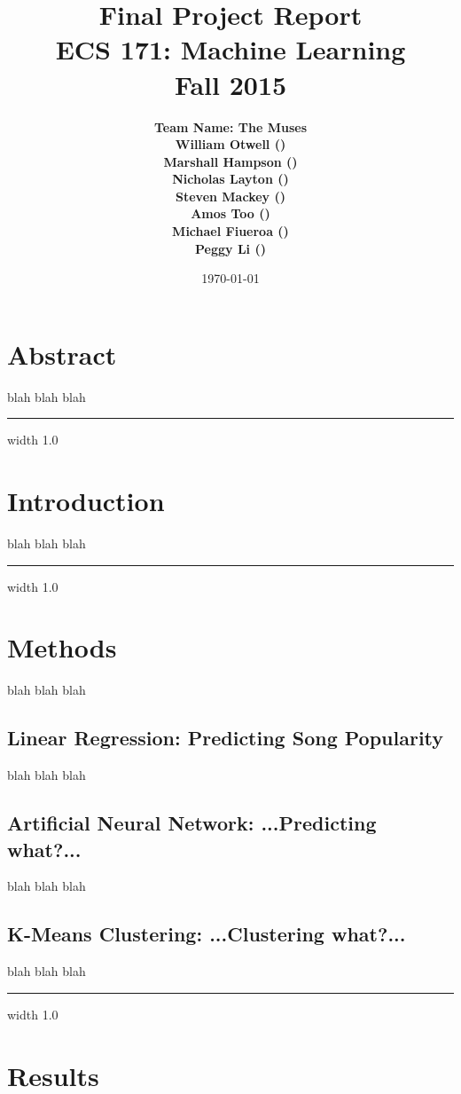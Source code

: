 \documentclass[11pt]{article}
\title{\vspace{-3ex}\bf Final Project Report\\[2ex] 
       \normalsize ECS 171: Machine Learning\\Fall 2015}
\date{\today}
\author{\bf Team Name: The Muses\\ \bf William Otwell ()\\ \bf Marshall Hampson ()\\ \bf Nicholas Layton ()\\ \bf Steven Mackey ()\\ \bf Amos Too ()\\ \bf Michael Fiueroa ()\\ \bf Peggy Li ()}
\newcommand{\horizontalLine}{
	\begin{center}
		\hrule width 1.0\textwidth
	\end{center}
}
\begin{document}
\maketitle
\pagebreak
\tableofcontents
\pagebreak

\section{Abstract}
\label{sec:abstract}
blah blah blah

\horizontalLine
\section{Introduction}
\label{sec:introduction}
blah blah blah

\horizontalLine
\section{Methods}
\label{sec:methods}
blah blah blah

\subsection{Linear Regression: Predicting Song Popularity}
\label{subsec:linearRegression}
blah blah blah

\subsection{Artificial Neural Network: ...Predicting what?...}
\label{subsec:ann}
blah blah blah

\subsection{K-Means Clustering: ...Clustering what?...}
\label{subsec:kMeans}
blah blah blah

\horizontalLine
\section{Results}
\label{sec:results}
\end{document}
